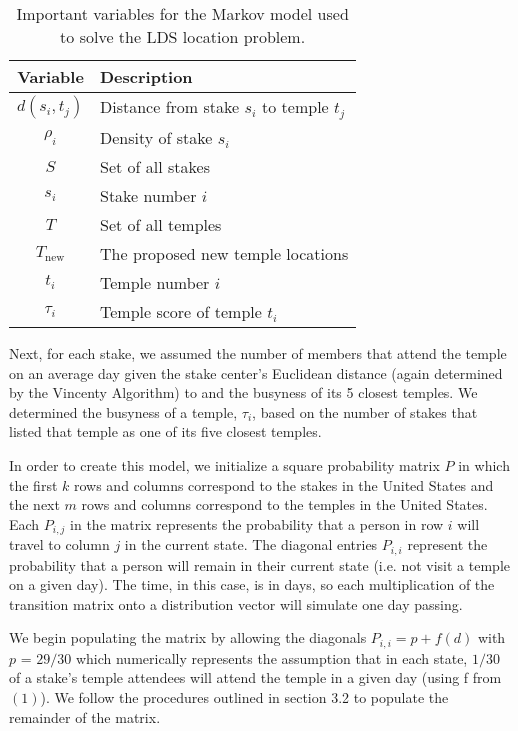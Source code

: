 \documentclass[twoside,twocolumn]{article}
\begin{document}
\begin{table}
\begin{tabular}{c | l}
Variable & Description\\
\hline
$d(s_i,t_j)$ & Distance from stake $s_i$ to temple $t_j$\\
$\rho_i$ & Density of stake $s_i$\\
$S$ & Set of all stakes\\
$s_i$ & Stake number $i$\\
$T$ & Set of all temples\\
$T_{\text{new}}$ & The proposed new temple locations\\
$t_i$ & Temple number $i$ \\
$\tau_i$ & Temple score of temple $t_i$\\
\end{tabular}
\caption{Important variables for the Markov model used to solve the LDS location problem.}
\end{table}

Next, for each stake, we assumed the number of members that attend the temple on an average day given the stake center's Euclidean distance (again determined by the Vincenty Algorithm) to and the busyness of its 5 closest temples.
We determined the busyness of a temple, $\tau_i$, based on the number of stakes that listed that temple as one of its five closest temples. %

In order to create this model, we initialize a square probability matrix $P$ in which the first $k$ rows and columns correspond to the stakes in the United States and the next $m$ rows and columns correspond to the temples in the United States.
Each $P_{i,j}$ in the matrix represents the probability that a person in row $i$ will travel to column $j$ in the current state.
The diagonal entries $P_{i,i}$ represent the probability that a person will remain in their current state (i.e. not visit a temple on a given day).
The time, in this case, is in days, so each multiplication of the transition matrix onto a distribution vector will simulate one day passing.


We begin populating the matrix by allowing the diagonals $P_{i,i} = p + f(d)$ with $p$ = $29/30$ which numerically represents the assumption that in each state, $1/30$ of a stake's temple attendees will attend the temple in a given day (using f from $(1)$).
We follow the procedures outlined in section 3.2 to populate the remainder of the matrix.
\end{document}
